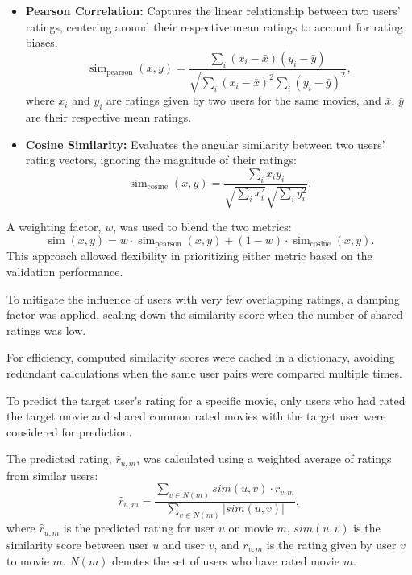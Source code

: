\documentclass[a4paper,9pt]{article}
\begin{document}
\begin{itemize}
	\item \textbf{Pearson Correlation:} Captures the linear relationship between two users' ratings, centering around their respective mean ratings to account for rating biases.
	      \begin{equation}
		      \operatorname{sim}_\text{pearson}(x,y) = \frac{\sum_{i} (x_i - \bar{x})(y_i - \bar{y})}{\sqrt{\sum_{i} (x_i - \bar{x})^2 \sum_{i} (y_i - \bar{y})^2}},
	      \end{equation}
	      where \( x_i \) and \( y_i \) are ratings given by two users for the same movies, and \( \bar{x} \), \( \bar{y} \) are their respective mean ratings.

	\item \textbf{Cosine Similarity:} Evaluates the angular similarity between two users' rating vectors, ignoring the magnitude of their ratings:
	      \begin{equation}
		      \operatorname{sim}_\text{cosine}(x,y) = \frac{\sum_{i} x_i y_i}{\sqrt{\sum_{i} x_i^2} \sqrt{\sum_{i} y_i^2}}.
	      \end{equation}
\end{itemize}


A weighting factor, $w$, was used to blend the two metrics:
\begin{equation}
	\operatorname{sim}(x,y) = w \cdot \operatorname{sim}_\text{pearson}(x,y) + (1 - w) \cdot \operatorname{sim}_\text{cosine}(x,y) .
\end{equation}
This approach allowed flexibility in prioritizing either metric based on the validation performance.

To mitigate the influence of users with very few overlapping ratings, a damping factor was applied, scaling down the
similarity score when the number of shared ratings was low.

For efficiency, computed similarity scores were cached in a dictionary, avoiding redundant calculations when the same user
pairs were compared multiple times.

To predict the target user's rating for a specific movie, only users who had rated the target movie and shared common
rated movies with the target user were considered for prediction.

The predicted rating, \( \hat{r}_{u,m} \), was calculated using a weighted average of ratings from similar users:
\begin{equation}
	\hat{r}_{u,m} = \frac{\sum_{v \in N(m)} sim(u,v) \cdot r_{v,m}}{\sum_{v \in N(m)} |sim(u,v)|},
\end{equation}
where \( \hat{r}_{u,m} \) is the predicted rating for user \( u \) on movie \( m \), \( sim(u,v) \) is the similarity score between user \( u \) and user \( v \), and \( r_{v,m} \) is the rating given by user \( v \) to movie \( m \). \( N(m) \) denotes the set of users who have rated movie \( m \).
\end{document}
